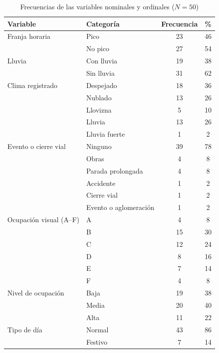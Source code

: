 \begin{table}[H]
\centering
\caption{Frecuencias de las variables nominales y ordinales ($N = 50$)}
\label{tab:frecuencias}
\small
\begin{tabular}{@{}l l c c@{}}
\toprule
\textbf{Variable} & \textbf{Categoría} & \textbf{Frecuencia} & \textbf{\%} \\
\midrule
Franja horaria & Pico & 23 & 46 \\
 & No pico & 27 & 54 \\
\midrule
Lluvia & Con lluvia & 19 & 38 \\
 & Sin lluvia & 31 & 62 \\
\midrule
Clima registrado & Despejado & 18 & 36 \\
 & Nublado & 13 & 26 \\
 & Llovizna & 5 & 10 \\
 & Lluvia & 13 & 26 \\
 & Lluvia fuerte & 1 & 2 \\
\midrule
Evento o cierre vial & Ninguno & 39 & 78 \\
 & Obras & 4 & 8 \\
 & Parada prolongada & 4 & 8 \\
 & Accidente & 1 & 2 \\
 & Cierre vial & 1 & 2 \\
 & Evento o aglomeración & 1 & 2 \\
\midrule
Ocupación visual (A--F) & A & 4 & 8 \\
 & B & 15 & 30 \\
 & C & 12 & 24 \\
 & D & 8 & 16 \\
 & E & 7 & 14 \\
 & F & 4 & 8 \\
\midrule
Nivel de ocupación & Baja & 19 & 38 \\
 & Media & 20 & 40 \\
 & Alta & 11 & 22 \\
\midrule
Tipo de día & Normal & 43 & 86 \\
 & Festivo & 7 & 14 \\
\bottomrule
\end{tabular}
\end{table}